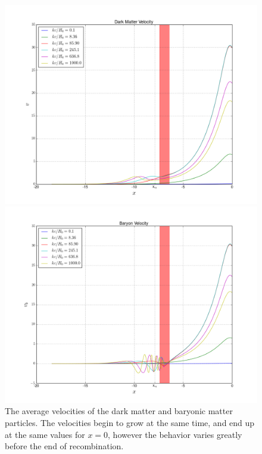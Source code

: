 \documentclass[a4paper]{article}
\begin{document}
\begin{figure}[ht!]
\label{fig:v}
\begin{minipage}{0.5\textwidth}
\centering
\includegraphics[width=1.0\linewidth]{v}
\end{minipage}%
\begin{minipage}{0.5\textwidth}
\centering
\includegraphics[width=1.0\linewidth]{v_b}
\end{minipage}
\caption{The average velocities of the dark matter and baryonic matter particles. The velocities begin to grow at the same time, and end up at the same values for $x=0$, however the behavior varies greatly before the end of recombination.}
\end{figure}
\end{document}
